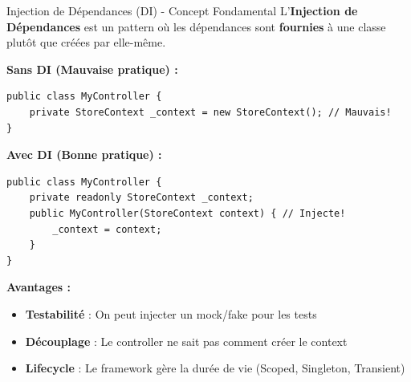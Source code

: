 \documentclass[12pt,a4paper]{article}
\begin{document}
\begin{defbox}{Injection de Dépendances (DI) - Concept Fondamental}
L'\textbf{Injection de Dépendances} est un pattern où les dépendances sont \textbf{fournies} à une classe plutôt que créées par elle-même.

\textbf{Sans DI (Mauvaise pratique) :}
\begin{lstlisting}[language=CSharp, numbers=none]
public class MyController {
    private StoreContext _context = new StoreContext(); // Mauvais!
}
\end{lstlisting}

\textbf{Avec DI (Bonne pratique) :}
\begin{lstlisting}[language=CSharp, numbers=none]
public class MyController {
    private readonly StoreContext _context;
    public MyController(StoreContext context) { // Injecte!
        _context = context;
    }
}
\end{lstlisting}

\textbf{Avantages :}
\begin{itemize}
    \item \textbf{Testabilité} : On peut injecter un mock/fake pour les tests
    \item \textbf{Découplage} : Le controller ne sait pas comment créer le context
    \item \textbf{Lifecycle} : Le framework gère la durée de vie (Scoped, Singleton, Transient)
\end{itemize}
\end{defbox}
\end{document}
